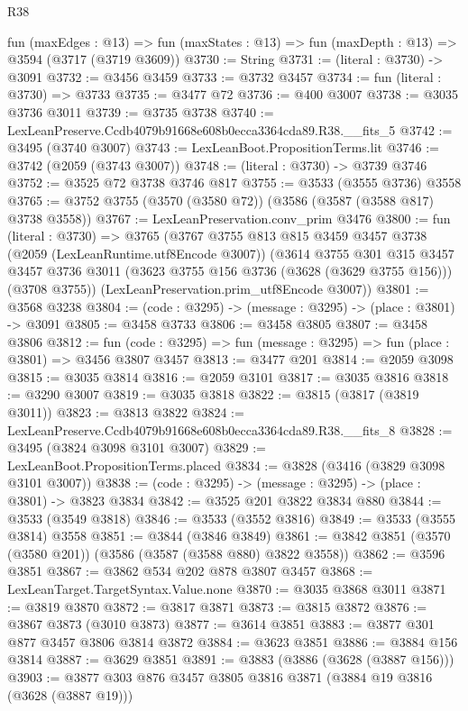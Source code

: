 \begin{lexlean}{R38}
\begin{coremodule}
  fun (maxEdges : @13) =>
  fun (maxStates : @13) => fun (maxDepth : @13) => @3594 (@3717 (@3719 @3609))
@3730 := String
@3731 := (literal : @3730) -> @3091
@3732 := @3456 @3459
@3733 := @3732 @3457
@3734 := fun (literal : @3730) => @3733
@3735 := @3477 @72
@3736 := @400 @3007
@3738 := @3035 @3736 @3011
@3739 := @3735 @3738
@3740 := LexLeanPreserve.Ccdb4079b91668e608b0ecca3364cda89.R38.__fits_5
@3742 := @3495 (@3740 @3007)
@3743 := LexLeanBoot.PropositionTerms.lit
@3746 := @3742 (@2059 (@3743 @3007))
@3748 := (literal : @3730) -> @3739 @3746
@3752 := @3525 @72 @3738 @3746 @817
@3755 := @3533 (@3555 @3736) @3558
@3765 := @3752 @3755 (@3570 (@3580 @72)) (@3586 (@3587 (@3588 @817) @3738 @3558))
@3767 := LexLeanPreservation.conv_prim @3476
@3800 := fun (literal : @3730) =>
  @3765
    (@3767
      @3755
      @813
      @815
      @3459
      @3457
      @3738
      (@2059 (LexLeanRuntime.utf8Encode @3007))
      (@3614
        @3755
        @301
        @315
        @3457
        @3457
        @3736
        @3011
        (@3623 @3755 @156 @3736 (@3628 (@3629 @3755 @156)))
        (@3708 @3755))
      (LexLeanPreservation.prim_utf8Encode @3007))
@3801 := @3568 @3238
@3804 := (code : @3295) -> (message : @3295) -> (place : @3801) -> @3091
@3805 := @3458 @3733
@3806 := @3458 @3805
@3807 := @3458 @3806
@3812 := fun (code : @3295) => fun (message : @3295) => fun (place : @3801) => @3456 @3807 @3457
@3813 := @3477 @201
@3814 := @2059 @3098
@3815 := @3035 @3814
@3816 := @2059 @3101
@3817 := @3035 @3816
@3818 := @3290 @3007
@3819 := @3035 @3818
@3822 := @3815 (@3817 (@3819 @3011))
@3823 := @3813 @3822
@3824 := LexLeanPreserve.Ccdb4079b91668e608b0ecca3364cda89.R38.__fits_8
@3828 := @3495 (@3824 @3098 @3101 @3007)
@3829 := LexLeanBoot.PropositionTerms.placed
@3834 := @3828 (@3416 (@3829 @3098 @3101 @3007))
@3838 := (code : @3295) -> (message : @3295) -> (place : @3801) -> @3823 @3834
@3842 := @3525 @201 @3822 @3834 @880
@3844 := @3533 (@3549 @3818)
@3846 := @3533 (@3552 @3816)
@3849 := @3533 (@3555 @3814) @3558
@3851 := @3844 (@3846 @3849)
@3861 := @3842 @3851 (@3570 (@3580 @201)) (@3586 (@3587 (@3588 @880) @3822 @3558))
@3862 := @3596 @3851
@3867 := @3862 @534 @202 @878 @3807 @3457
@3868 := LexLeanTarget.TargetSyntax.Value.none
@3870 := @3035 @3868 @3011
@3871 := @3819 @3870
@3872 := @3817 @3871
@3873 := @3815 @3872
@3876 := @3867 @3873 (@3010 @3873)
@3877 := @3614 @3851
@3883 := @3877 @301 @877 @3457 @3806 @3814 @3872
@3884 := @3623 @3851
@3886 := @3884 @156 @3814
@3887 := @3629 @3851
@3891 := @3883 (@3886 (@3628 (@3887 @156)))
@3903 := @3877 @303 @876 @3457 @3805 @3816 @3871 (@3884 @19 @3816 (@3628 (@3887 @19)))

\end{coremodule}
\end{lexlean}
